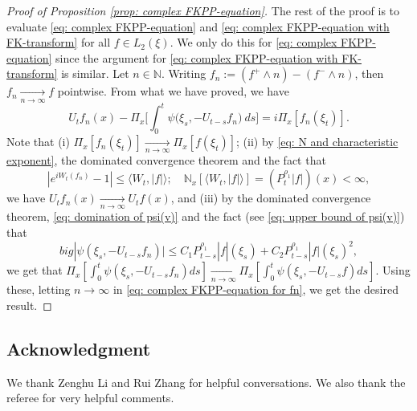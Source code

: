 \documentclass[12pt,a4paper]{amsart}
\theoremstyle{plain}
\theoremstyle{definition}
\numberwithin{equation}{section}
\begin{document}
\begin{proof}[Proof of Proposition \ref{prop: complex FKPP-equation}]
The rest of the proof is to evaluate \eqref{eq: complex FKPP-equation} and \eqref{eq: complex FKPP-equation with FK-transform} for all $f\in L_2(\xi)$. We only do this for \eqref{eq: complex FKPP-equation} since the argument for \eqref{eq: complex FKPP-equation with FK-transform} is similar.
Let $n \in \mathbb N$.
Writing $f_n := (f^+ \wedge n) - (f^- \wedge n)$, then $f_n \xrightarrow[n\to \infty]{} f$ pointwise.
From what we have proved, we have
\begin{equation}
  \label{eq: complex FKPP-equation for fn}
  U_tf_n(x) - \Pi_{x} \Big[\int_0^t \psi\big(\xi_s, - U_{t-s}f_n\big) ~ds\Big]
  = i \Pi_{x} [f_n(\xi_t)].
\end{equation}
Note that 
(i) $\Pi_{x}[f_n(\xi_t)] \xrightarrow[n\to \infty]{} \Pi_{x}[f(\xi_t)]$;
(ii) by \eqref{eq: N and characteristic exponent}, the dominated convergence theorem and the fact that
\[
  |e^{i W_t(f_n)} - 1| \leq \langle W_t, |f|\rangle;
  \quad \mathbb N_x[\langle W_t, |f|\rangle] = (P_t^{\rho_1} |f|)(x) < \infty,
\]
we have $U_tf_n(x) \xrightarrow[n\to \infty]{} U_tf(x)$, and (iii) by the dominated convergence theorem, \eqref{eq: domination of psi(v)} and the fact (see \eqref{eq: upper bound of psi(v)}) that
\[
  big|\psi(\xi_s,- U_{t-s}f_n)\big|
  \leq C_1 P_{t-s}^{\rho_1}|f|(\xi_s)+C_2 P_{t-s}^{\rho_1}|f|(\xi_s)^2,
\]
we get that $\Pi_{x} [\int_0^t \psi(\xi_s,- U_{t-s}f_n)ds] \xrightarrow[n\to \infty]{} \Pi_{x} [\int_0^t \psi(\xi_s,- U_{t-s}f)ds]$.
Using these, letting $n \to \infty$ in \eqref{eq: complex FKPP-equation for fn}, we get the desired result.
\end{proof}

\subsection*{Acknowledgment}
We thank Zenghu Li and Rui Zhang for helpful conversations.
We also thank the referee for very helpful comments.
\end{document}
